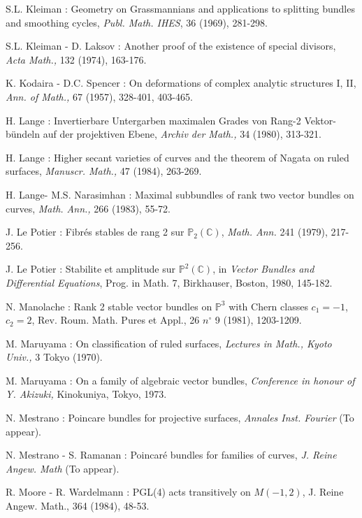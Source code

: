 \begin{thebibliography}{}
 S.L. Kleiman : Geometry on Grassmannians and applications to splitting bundles and smoothing cycles, {\em Publ. Math. IHES}, 36 (1969), 281-298. 

 S.L. Kleiman - D. Laksov : Another proof of the existence of special divisors, {\em Acta Math.,} 132 (1974), 163-176.

 K. Kodaira - D.C. Spencer : On deformations of complex analytic structures I, II, {\em Ann. of Math.,} 67 (1957), 328-401, 403-465.

 H. Lange : Invertierbare Untergarben maximalen Grades von Rang-2 Vektor-b\"undeln auf der projektiven Ebene, {\em Archiv der Math.,} 34 (1980), 313-321.

 H. Lange : Higher secant varieties of curves and the theorem of Nagata on ruled surfaces, {\em Manuscr. Math.,} 47 (1984), 263-269.

 H. Lange\pageoriginale - M.S. Narasimhan : Maximal subbundles of rank two vector bundles on curves, {\em Math. Ann.,} 266 (1983), 55-72.

 J. Le Potier : Fibr\'es stables de rang 2 sur $\mathbb{P}_{2}(\mathbb{C})$, {\em Math. Ann.} 241 (1979), 217-256.

 J. Le Potier : Stabilite et amplitude sur $\mathbb{P}^{2}(\mathbb{C})$, in {\em Vector Bundles and Differential Equations}, Prog. in Math. 7, Birkhauser, Boston, 1980, 145-182.

  N. Manolache : Rank 2 stable vector bundles on $\mathbb{P}^{3}$ with Chern classes $c_{1}=-1$, $c_{2}=2$, {\rm Rev. Roum. Math. Pures et Appl.,} 26 $n^{\circ}$ 9 (1981), 1203-1209.

 M. Maruyama : On classification of ruled surfaces, {\em Lectures in Math., Kyoto Univ.,} 3 Tokyo (1970).

 M. Maruyama : On a family of algebraic vector bundles, {\em Conference in honour of Y. Akizuki,} Kinokuniya, Tokyo, 1973.

  N. Mestrano : Poincare bundles for projective surfaces, {\em Annales Inst. Fourier} (To appear).

  N. Mestrano - S. Ramanan : Poincar\'e bundles for families of curves, {\em J. Reine Angew. Math} (To appear).

 R. Moore - R. Wardelmann : PGL(4) acts transitively on $M(-1,2)$, {\rm J. Reine Angew. Math.,} 364 (1984), 48-53.


\end{thebibliography}
